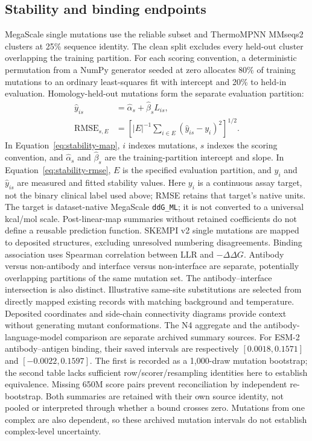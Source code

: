 \subsection{Stability and binding endpoints}
MegaScale single mutations use the reliable subset and ThermoMPNN MMseqs2 clusters at 25\% sequence identity. The clean split excludes every held-out cluster overlapping the training partition. For each scoring convention, a deterministic permutation from a NumPy generator seeded at zero allocates 80\% of training mutations to an ordinary least-squares fit with intercept and 20\% to held-in evaluation. Homology-held-out mutations form the separate evaluation partition:
\begin{align}
\widehat y_{is}&=\widehat\alpha_s+\widehat\beta_sL_{is},\label{eq:stability-map}\\
\mathrm{RMSE}_{s,E}&=\left[|E|^{-1}\sum_{i\in E}(\widehat y_{is}-y_i)^2\right]^{1/2}.\label{eq:stability-rmse}
\end{align}
In Equation~\ref{eq:stability-map}, $i$ indexes mutations, $s$ indexes the
scoring convention, and $\widehat\alpha_s$ and $\widehat\beta_s$ are the
training-partition intercept and slope. In Equation~\ref{eq:stability-rmse},
$E$ is the specified evaluation partition, and $y_i$ and $\widehat y_{is}$
are measured and fitted stability values. Here $y_i$ is a continuous
assay target, not the binary clinical label used above; RMSE retains that
target's native units.
The target is dataset-native MegaScale \texttt{ddG\_ML}; it is not converted to a universal kcal/mol scale. Post-linear-map summaries without retained coefficients do not define a reusable prediction function.
SKEMPI v2 single mutations are mapped to deposited structures, excluding unresolved numbering disagreements. Binding association uses Spearman correlation between LLR and $-\Delta\Delta G$. Antibody versus non-antibody and interface versus non-interface are separate, potentially overlapping partitions of the same mutation set. The antibody--interface intersection is also distinct. Illustrative same-site substitutions are selected from directly mapped existing records with matching background and temperature. Deposited coordinates and side-chain connectivity diagrams provide context without generating mutant conformations.
The N4 aggregate and the antibody-language-model comparison are separate archived summary sources. For ESM-2 antibody--antigen binding, their saved intervals are respectively $[0.0018,0.1571]$ and $[-0.0022,0.1597]$. The first is recorded as a 1,000-draw mutation bootstrap; the second table lacks sufficient row/scorer/resampling identities here to establish equivalence. Missing 650M score pairs prevent reconciliation by independent re-bootstrap. Both summaries are retained with their own source identity, not pooled or interpreted through whether a bound crosses zero. Mutations from one complex are also dependent, so these archived mutation intervals do not establish complex-level uncertainty.

